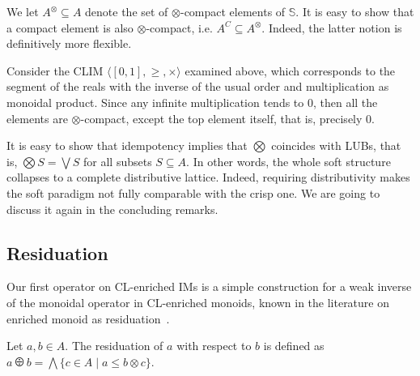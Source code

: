 \documentclass[main.tex]{subfiles}
\begin{document}
We let $A^\otimes \subseteq A$ denote the set of $\otimes$-compact elements of ${\mathbb S}$.
%
It is easy to show that a compact element is also $\otimes$-compact, i.e. $A^C \subseteq A^\otimes$.
Indeed, the latter notion is definitively more flexible.

\begin{example}
%
Consider the CLIM $\langle [0, 1], \geq, \times \rangle$ examined above, which corresponds to  
the segment of the reals with the inverse of the usual order and multiplication 
as monoidal product.
Since any infinite multiplication tends to $0$, then all the elements are
$\otimes$-compact, except the top element itself, that is, precisely $0$.
\end{example}
%

\begin{remark}
%
It is easy to show that idempotency implies that $\bigotimes$ 
coincides with LUBs, that is,
$\bigotimes S = \bigvee S$ for all subsets $S \subseteq A$.
%
In other words, the whole soft structure collapses to a
complete distributive lattice.
%
Indeed, requiring distributivity makes the soft paradigm not fully comparable with the crisp one.
We are going to discuss it again in the concluding remarks.
\end{remark}

\subsection{Residuation}
Our first operator on CL-enriched IMs
is a simple construction for a weak inverse of the
monoidal operator in CL-enriched monoids, known in the literature
on enriched monoid as residuation~\cite{golan,residuated}.

\begin{definition}[Residuation]
Let $a, b \in A$. The residuation of $a$ with respect to $b$ is defined as
$a \odiv b = \bigwedge \{ c \in A \mid a\leq b \otimes c\}$.
\end{definition}
\end{document}
